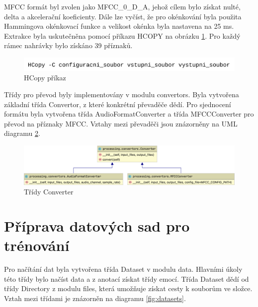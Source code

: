 \documentclass[FM,BP]{tulthesis}
\begin{document}
MFCC formát byl zvolen jako MFCC\_0\_D\_A, jehož cílem bylo získat nulté, delta a akcelerační koeficienty. Dále lze vyčíst, že pro okénkování byla použita Hammingova okénkovací funkce a velikost okénka byla nastavena na 25 ms. Extrakce byla uskutečněna pomocí příkazu HCOPY na obrázku \mbox{\ref{fig:htk}}. Pro každý rámec nahrávky bylo získáno 39 příznaků.

\begin{figure}[htbp]
\centerline{\includegraphics[width=\textwidth,height=\textheight,keepaspectratio]{htk_command.png}}
\caption{HCopy příkaz}
\label{fig:htk}
\end{figure}
\FloatBarrier

Třídy pro převod byly implementovány v modulu convertors. Byla vytvořena základní třída Convertor, z které konkrétní převaděče dědí. Pro sjednocení formátu byla vytvořena třída AudioFormatConverter a třída MFCCConverter pro převod na příznaky MFCC. Vztahy mezi převaděči jsou znázorněny na UML diagramu \mbox{\ref{fig:convertor}}.

\begin{figure}[ht]
\centerline{\includegraphics[width=\textwidth,height=\textheight,keepaspectratio]{convertors.png}}
\caption{Třídy Converter}
\label{fig:convertor}
\end{figure}
\FloatBarrier

\section{Příprava datových sad pro trénování} %
Pro načítání dat byla vytvořena třída Dataset v modulu data. Hlavními úkoly této třídy bylo načíst data a z anotací získat třídy emocí. Třída Dataset dědí od třídy Directory z modulu files, která umožňuje získat cesty k souborům ve složce. Vztah mezi třídami je znázorněn na diagramu \mbox{\ref{fig:datasets}}.
\end{document}
